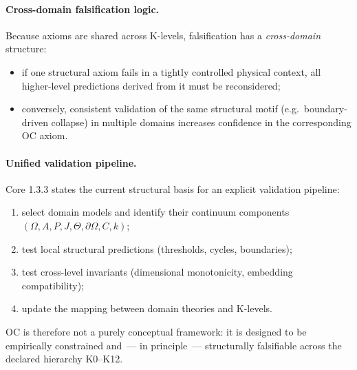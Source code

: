 \paragraph{Cross-domain falsification logic.}
Because axioms are shared across K-levels, falsification has a
\emph{cross-domain} structure:
\begin{itemize}
  \item if one structural axiom fails in a tightly controlled physical
        context, all higher-level predictions derived from it must be
        reconsidered;
  \item conversely, consistent validation of the same structural motif
        (e.g.\ boundary-driven collapse) in multiple domains increases
        confidence in the corresponding OC axiom.
\end{itemize}

\paragraph{Unified validation pipeline.}
Core 1.3.3 states the current structural basis for an explicit validation pipeline:
\begin{enumerate}
  \item select domain models and identify their continuum components
        \((\Omega, A, P, J, \Theta, \partial\Omega, C, k)\);
  \item test local structural predictions (thresholds, cycles, boundaries);
  \item test cross-level invariants (dimensional monotonicity,
        embedding compatibility);
  \item update the mapping between domain theories and K-levels.
\end{enumerate}

OC is therefore not a purely conceptual framework: it is designed to be
empirically constrained and~— in principle~— structurally falsifiable across
the declared hierarchy K0--K12.

